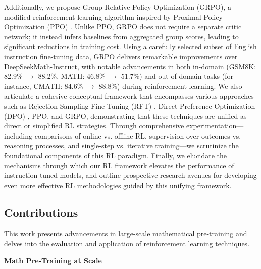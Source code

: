 Additionally, we propose Group Relative Policy Optimization (GRPO), a modified reinforcement learning algorithm inspired by Proximal Policy Optimization (PPO) \citep{schulman2017proximal}. Unlike PPO, GRPO does not require a separate critic network; it instead infers baselines from aggregated group scores, leading to significant reductions in training cost. Using a carefully selected subset of English instruction fine-tuning data, GRPO delivers remarkable improvements over DeepSeekMath-Instruct, with notable advancements in both in-domain (GSM8K: 82.9\% $\rightarrow$ 88.2\%, MATH: 46.8\% $\rightarrow$ 51.7\%) and out-of-domain tasks (for instance, CMATH: 84.6\% $\rightarrow$ 88.8\%) during reinforcement learning. We also articulate a cohesive conceptual framework that encompasses various approaches such as Rejection Sampling Fine-Tuning (RFT) \citep{yuan2023scaling}, Direct Preference Optimization (DPO) \citep{dpo}, PPO, and GRPO, demonstrating that these techniques are unified as direct or simplified RL strategies. Through comprehensive experimentation—including comparisons of online vs. offline RL, supervision over outcomes vs. reasoning processes, and single-step vs. iterative training—we scrutinize the foundational components of this RL paradigm. Finally, we elucidate the mechanisms through which our RL framework elevates the performance of instruction-tuned models, and outline prospective research avenues for developing even more effective RL methodologies guided by this unifying framework.

\subsection{Contributions}
This work presents advancements in large-scale mathematical pre-training and delves into the evaluation and application of reinforcement learning techniques.

\textbf{Math Pre-Training at Scale}

